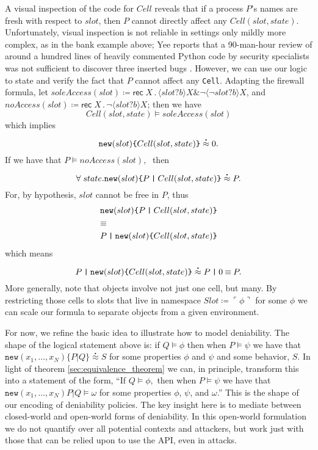 \documentclass[]{acm_proc_article-sp}
\newcommand{\lpquote}{\ulcorner}
\newcommand{\rpquote}{\urcorner}
\newcommand{\id}[1]{\texttt{#1}}
\newcommand{\juxtap}{\mathbin{\id{|}}}
\newcommand{\scong}{\mathbin{\equiv}}
\newcommand{\binpar}[2]{#1 \juxtap #2}
\newcommand{\defneqls}{\coloneqq}
\newcommand{\wbbisim}{\stackrel{\centerdot}{\approx}} %
\newcommand{\pquotep}[1]{\lpquote #1 \rpquote}
\newcommand{\pprefix}[3]{\langle #1 ? #2 \rangle #3}
\newcommand{\pgfp}[2]{\textsf{rec} \; #1 \mathbin{.} #2}
\numberwithin{equation}{subsection}
\begin{document}
A visual inspection of the code for $Cell$ reveals that if a process
$P$'s names are fresh with respect to $slot$, then $P$ cannot directly affect
any $Cell( slot, state )$. Unfortunately, visual inspection is not
reliable in settings only mildly more complex, as in the bank example
above; Yee reports that a 90-man-hour review of around a hundred lines
of heavily commented Python code by security specialists was not
sufficient to discover three inserted bugs \cite[Section
7]{Yee:EECS-2007-136}.  However, we can use our logic to state and
verify the fact that $P$ cannot affect any {\tt Cell}. Adapting the
firewall formula, let $soleAccess( slot ) \defneqls
\pgfp{X}{\pprefix{slot}{b}{X} \& \neg \pprefix{\neg slot}{b}{X}}$, and
$noAccess( slot ) \defneqls \pgfp{X}{\neg \pprefix{slot}{b}{X}}$; then
we have
\[Cell (slot, state) \models soleAccess( slot )\]
which implies
\[{\mbox{\tt new}(slot)\mbox{\tt \{} Cell(slot, state) \mbox{\tt \}}}
\wbbisim 0.\]
If we have that $P \models noAccess( slot ), \;$ then 
\[\forall \; state . \mbox{\tt new}(slot)\mbox{\tt \{}
\binpar{P}{Cell(slot, state)} \mbox{\tt \}}\wbbisim P.\]
For, by hypothesis, $slot$ cannot be free in $P$, thus
\begin{equation*}
  \begin{aligned}
    & \mbox{\tt new}(slot)\mbox{\tt \{} \binpar{P}{Cell(slot, state)} \mbox{\tt \}}\\
    & \scong \\
    & \binpar{P}{\mbox{\tt new}(slot)\mbox{\tt \{} Cell(slot, state) \mbox{\tt \}}} \\
  \end{aligned}
\end{equation*}
\noindent which means
\[\binpar{P}{\mbox{\tt new}(slot)\mbox{\tt \{} Cell(slot, state)
  \mbox{\tt \}}} \wbbisim \binpar{P}{0} \scong P.\]
More generally, note that objects involve not just one cell, but
many. By restricting those cells to slots that live in namespace $Slot
\defneqls \pquotep{\phi}$ for some $\phi$ we can scale our formula to
separate objects from a given environment. 

For now, we refine the basic idea to illustrate how to model
deniability. The shape of the logical statement above is: if $Q
\models \phi$ then when $P \models \psi$ we have that
$\texttt{new}(x_1,\ldots,x_N)\{ \binpar{P}{Q} \} \wbbisim S$ for some
properties $\phi$ and $\psi$ and some behavior, $S$. In light of
theorem \ref{sec:equivalence_theorem} we can, in principle, transform
this into a statement of the form, ``If $Q \models \phi,$ then when $P
\models \psi$ we have that $\texttt{new}(x_1,\ldots,x_N)\binpar{P}{Q}
\models \omega$ for some properties $\phi$, $\psi$, and $\omega$.'' This
is the shape of our encoding of deniability policies. The key insight
here is to mediate between closed-world and open-world forms of
deniability. In this open-world formulation we do not quantify over
all potential contexts and attackers, but work just with those that
can be relied upon to use the API, even in attacks.
\end{document}

